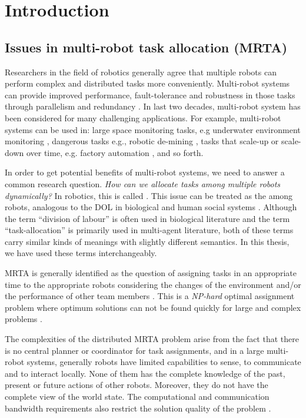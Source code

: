 \chapter{Introduction}
\label{intro}
\section{Issues in multi-robot task allocation (MRTA)}
\label{intro:mrta}
Researchers in the field of robotics generally agree that multiple robots can perform complex and distributed tasks more conveniently. Multi-robot systems can provide improved performance, fault-tolerance and robustness in those tasks through parallelism and redundancy \cite{Arkin1998,Parker+2006}. In last two decades, multi-robot system has been considered for many challenging applications. For example, multi-robot systems can be used in: large space monitoring tasks, e.g underwater environment monitoring \cite{Eriksen+2001}, dangerous tasks e.g., robotic de-mining \cite{Dunbar+2002}, tasks that scale-up or scale-down over time, e.g. factory automation \cite{Wurman+2008}, and so forth.

In order to get potential benefits of multi-robot systems, we need to answer a common research question. \textit{How can we allocate tasks among multiple robots dynamically?} In robotics, this is called  \cite{Gerkey+2004}. This issue can be treated as the  among robots, analogous to the DOL in biological and human social systems \cite{Sendova-Franks+1999}. Although the term ``division of labour'' is often used in biological literature and the term ``task-allocation'' is primarily used in multi-agent literature, both of these terms carry similar kinds of meanings with slightly different semantics. In this thesis, we have used these terms interchangeably.

MRTA is generally identified as the question of assigning tasks in an appropriate time to the appropriate robots considering the changes of the environment and/or the performance of other team members \cite{Gerkey+2003}. This is a {\em NP-hard} optimal assignment problem where optimum solutions can not be found quickly for large and complex problems \cite{Parker2008}.

The complexities of the distributed MRTA problem arise from the fact that there is no central planner or coordinator for task assignments, and in a large multi-robot systems, generally robots have limited capabilities to sense, to communicate and to interact locally. None of them has the complete knowledge of the past, present or future actions of other robots. Moreover, they do not have the complete view of the world state. The computational and communication bandwidth requirements also restrict the solution quality of the problem \cite{Gerkey+2004}.

